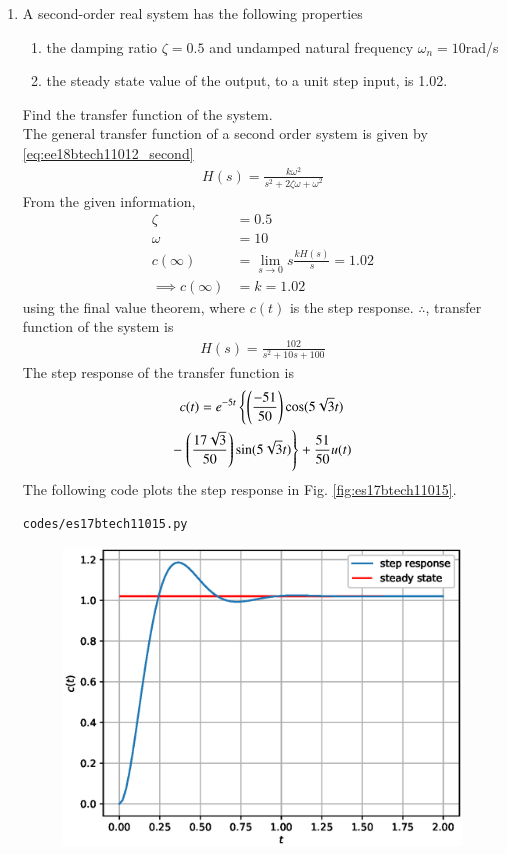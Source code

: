 \begin{enumerate}[label=\thesection.\arabic*.,ref=\thesection.\theenumi]

\item A second-order real system has the following properties
\begin{enumerate}
\item the damping ratio $\zeta=0.5$ and undamped natural frequency $\omega_n=10$rad/s 

\item  the steady state value of the output, to a unit step input, is 1.02.
\end{enumerate}

Find the transfer function of the system. 
\\
\solution The general transfer function of a second order system is given by \eqref{eq:ee18btech11012_second}
%
\begin{align}
H(s)=\frac{k\omega^2}{s^2+2\zeta\omega+\omega^2}
\end{align}
%
From the given information, 
\begin{align}
\zeta&=0.5
\\
\omega&=10
\\
    c(\infty)&=\lim_{s \to 0}s\frac{kH(s)}{s} = 1.02
\\
\implies     c(\infty)&=k=1.02
\end{align}
%
using the final value theorem, where $c(t)$ is the step response.  
$\therefore$, transfer function of the system is
\begin{align}
H(s) =     \frac{102}{s^2+10s+100}
\end{align}
The step response of the transfer function  is 
\begin{multline}
c(t)=e^{-5t}\left\{\left(\frac{-51}{50}\right)\cos(5\sqrt{3}t)\right.\\
-\left.\left(\frac{17\sqrt{3}}{50}\right)\sin(5\sqrt{3}t)\right\}+\frac{51}{50}u(t)
\end{multline}
The following code plots the step response in Fig. \ref{fig:es17btech11015}.
\begin{lstlisting}
codes/es17btech11015.py
\end{lstlisting}
\begin{figure}
\centering
\includegraphics[width=\columnwidth]{./figs/es17btech11015.eps}

\end{figure}
\end{enumerate}
